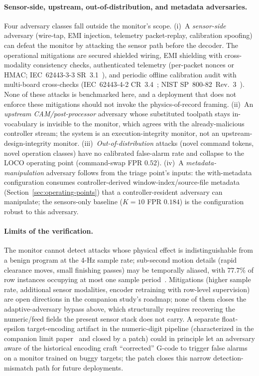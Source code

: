 \documentclass[sensors,article,submit,moreauthors,pdftex]{Definitions/mdpi}
\begin{document}
\paragraph{Sensor-side, upstream, out-of-distribution, and metadata adversaries.} Four adversary classes fall outside the monitor's scope. (i)~A \emph{sensor-side} adversary (wire-tap, EMI injection, telemetry packet-replay, calibration spoofing) can defeat the monitor by attacking the sensor path before the decoder. The operational mitigations are secured shielded wiring, EMI shielding with cross-modality consistency checks, authenticated telemetry (per-packet nonces or HMAC; IEC~62443-3-3 SR~3.1~\cite{iec62443-3-3}), and periodic offline calibration audit with multi-board cross-checks (IEC~62443-4-2 CR~3.4~\cite{iec62443-4-2}; NIST SP~800-82~Rev.~3~\cite{nist2023sp80082}). None of these attacks is benchmarked here, and a deployment that does not enforce these mitigations should not invoke the physics-of-record framing. (ii)~An \emph{upstream CAM/post-processor} adversary whose substituted toolpath stays in-vocabulary is invisible to the monitor, which agrees with the already-malicious controller stream; the system is an execution-integrity monitor, not an upstream-design-integrity monitor. (iii)~\emph{Out-of-distribution} attacks (novel command tokens, novel operation classes) have no calibrated false-alarm rate and collapse to the LOCO operating point (command-swap FPR $0.52$). (iv)~A \emph{metadata-manipulation} adversary follows from the triage point's inputs: the with-metadata configuration consumes controller-derived window-index/source-file metadata (Section~\ref{sec:operating-points}) that a controller-resident adversary can manipulate; the sensors-only baseline ($K\!=\!10$ FPR $0.184$) is the configuration robust to this adversary.

\paragraph{Limits of the verification.} The monitor cannot detect attacks whose physical effect is indistinguishable from a benign program at the 4-Hz sample rate; sub-second motion details (rapid clearance moves, small finishing passes) may be temporally aliased, with $77.7\%$ of row instances occupying at most one sample period~\cite{decoder_paper}. Mitigations (higher sample rate, additional sensor modalities, encoder retraining with row-level supervision) are open directions in the companion study's roadmap; none of them closes the adaptive-adversary bypass above, which structurally requires recovering the numeric/feed fields the present sensor stack does not carry. A separate float-epsilon target-encoding artifact in the numeric-digit pipeline (characterized in the companion limit paper~\cite{paperB_entropy} and closed by a patch) could in principle let an adversary aware of the historical encoding craft ``corrected'' G-code to trigger false alarms on a monitor trained on buggy targets; the patch closes this narrow detection-mismatch path for future deployments.
\end{document}
